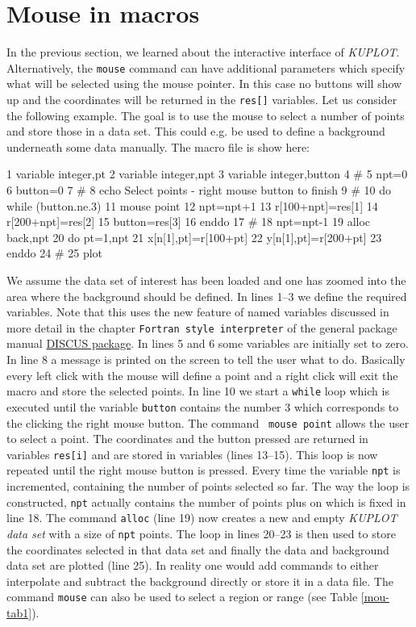 \section{Mouse in macros \label{mouse-mac}}

In the previous section, we learned about the interactive interface
of {\it KUPLOT}. Alternatively, the {\tt mouse} command can have
additional parameters which specify what will be selected using the
mouse pointer. In this case no buttons will show up and the
coordinates will be returned in the {\tt res[]} variables. Let us
consider the following example. The goal is to use the mouse to
select a number of points and store those in a data set. This could
e.g. be used to define a background underneath some data manually.
The macro file is show here:
%
\begin{MacVerbatim}
    1  variable integer,pt
    2  variable integer,npt
    3  variable integer,button
    4  #
    5  npt=0
    6  button=0
    7  #
    8  echo Select points - right mouse button to finish
    9  #
   10  do while (button.ne.3)
   11    mouse point
   12    npt=npt+1
   13    r[100+npt]=res[1]
   14    r[200+npt]=res[2]
   15    button=res[3]
   16  enddo
   17  #
   18  npt=npt-1
   19  alloc back,npt
   20  do pt=1,npt
   21    x[n[1],pt]=r[100+pt]
   22    y[n[1],pt]=r[200+pt]
   23  enddo
   24  #
   25  plot
\end{MacVerbatim}
%
We assume the data set of interest has been loaded and one has
zoomed into the area where the background should be defined. In
lines 1--3 we define the required variables. Note that this uses the
new feature of named variables discussed in more detail in the chapter
{\tt Fortran style interpreter} of the general package manual
\href{./package\_man.pdf}{DISCUS package}. In lines 5 and 6 some variables are initially set to
zero. In line 8 a message is printed on the screen to tell the user
what to do. Basically every left click with the mouse will define a
point and a right click will exit the macro and store the selected
points. In line 10 we start a {\tt while} loop which is executed
until the variable {\tt button} contains the number 3 which
corresponds to the clicking the right mouse button. The command {\tt
mouse point} allows the user to select a point. The coordinates and
the button pressed are returned in variables {\tt res[i]} and are
stored in variables (lines 13--15). This loop is now repeated until
the right mouse button is pressed. Every time the variable {\tt npt}
is incremented, containing the number of points selected so far. The
way the loop is constructed, {\tt npt} actually contains the number
of points plus on which is fixed in line 18. The command {\tt alloc}
(line 19) now creates a new and empty {\it KUPLOT data set} with a
size of {\tt npt} points. The loop in lines 20--23 is then used to
store the coordinates selected in that data set and finally the data
and background data set are plotted (line 25). In reality one would
add commands to either interpolate and subtract the background
directly or store it in a data file. The command {\tt mouse} can
also be used to select a region or range (see Table \ref{mou-tab1}).

